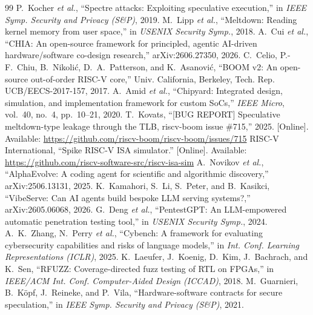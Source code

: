 \documentclass[conference,10pt]{IEEEtran}
\begin{document}
\begin{thebibliography}{99}
 P.~Kocher \emph{et al.}, ``Spectre attacks: Exploiting speculative execution,'' in \emph{IEEE Symp. Security and Privacy (S\&P)}, 2019.
 M.~Lipp \emph{et al.}, ``Meltdown: Reading kernel memory from user space,'' in \emph{USENIX Security Symp.}, 2018.
 A.~Cui \emph{et al.}, ``{CHIA}: An open-source framework for principled, agentic {AI}-driven hardware/software co-design research,'' arXiv:2606.27350, 2026.
 C.~Celio, P.-F.~Chiu, B.~Nikoli\'c, D.~A.~Patterson, and K.~Asanovi\'c, ``{BOOM} v2: An open-source out-of-order {RISC-V} core,'' Univ. California, Berkeley, Tech. Rep. UCB/EECS-2017-157, 2017.
 A.~Amid \emph{et al.}, ``Chipyard: Integrated design, simulation, and implementation framework for custom {SoCs},'' \emph{IEEE Micro}, vol.~40, no.~4, pp.~10--21, 2020.
 T.~Kovats, ``[BUG REPORT] Speculative meltdown-type leakage through the {TLB}, riscv-boom issue \#715,'' 2025. [Online]. Available: \url{https://github.com/riscv-boom/riscv-boom/issues/715}
 RISC-V International, ``Spike {RISC-V} {ISA} simulator.'' [Online]. Available: \url{https://github.com/riscv-software-src/riscv-isa-sim}
 A.~Novikov \emph{et al.}, ``{AlphaEvolve}: A coding agent for scientific and algorithmic discovery,'' arXiv:2506.13131, 2025.
 K.~Kamahori, S.~Li, S.~Peter, and B.~Kasikci, ``{VibeServe}: Can {AI} agents build bespoke {LLM} serving systems?,'' arXiv:2605.06068, 2026.
 G.~Deng \emph{et al.}, ``{PentestGPT}: An {LLM}-empowered automatic penetration testing tool,'' in \emph{USENIX Security Symp.}, 2024.
 A.~K.~Zhang, N.~Perry \emph{et al.}, ``{Cybench}: A framework for evaluating cybersecurity capabilities and risks of language models,'' in \emph{Int. Conf. Learning Representations (ICLR)}, 2025.
 K.~Laeufer, J.~Koenig, D.~Kim, J.~Bachrach, and K.~Sen, ``{RFUZZ}: Coverage-directed fuzz testing of {RTL} on {FPGAs},'' in \emph{IEEE/ACM Int. Conf. Computer-Aided Design (ICCAD)}, 2018.
 M.~Guarnieri, B.~K\"opf, J.~Reineke, and P.~Vila, ``Hardware-software contracts for secure speculation,'' in \emph{IEEE Symp. Security and Privacy (S\&P)}, 2021.
\end{thebibliography}
\end{document}
